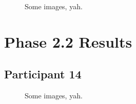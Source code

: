 \lipsum[1]

\clearpage

\begin{figure}[h]
	\caption{Some images, yah.}
\end{figure}

\lipsum[1]


\clearpage

\section{Phase 2.2 Results}

\lipsum[1]

\lipsum[2]

\lipsum[3]


\clearpage

\subsection{Participant 14}

\begin{figure}[h]
	\caption{Some images, yah.}
\end{figure}

